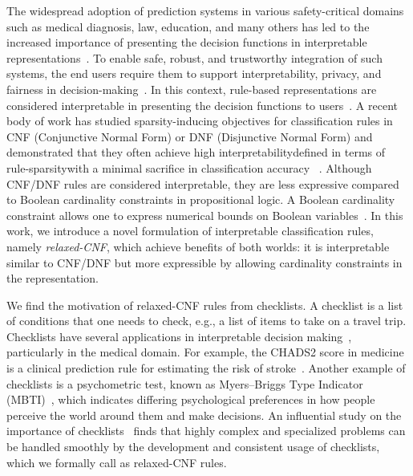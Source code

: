 

The widespread adoption of prediction systems in various safety-critical domains such as medical diagnosis, law, education, and many others has led to the increased importance of presenting the decision functions in interpretable representations~\cite{K2001,MVBB2005,SAD2015,S2014,TV2013}.  To enable  safe, robust, and trustworthy integration of such systems, the end users require them to support interpretability, privacy, and fairness in decision-making~\cite{DF2018,VML2012,WRLKM2015,ZUR2017}. In this context,  rule-based representations are considered interpretable in presenting the decision functions to users~\cite{LKCL2019,WR2015,WRDLKM2017}. A recent body of work has studied sparsity-inducing objectives for classification rules in CNF ({Conjunctive Normal Form}) or DNF ({Disjunctive Normal Form}) and demonstrated that they often achieve high interpretability\textemdash defined in terms of rule-sparsity\textemdash with a minimal sacrifice in classification accuracy ~\cite{GM2019,LKCL2019,MM18}. Although CNF/DNF rules are considered interpretable, they are less expressive compared to Boolean cardinality constraints in propositional logic. A Boolean cardinality constraint allows one to express numerical bounds on Boolean variables~\cite{sinz2005towards}. In this work, we introduce a novel formulation of interpretable classification rules, namely \emph{relaxed-CNF}, which achieve benefits of  both worlds: it is interpretable similar to CNF/DNF  but more expressible by allowing cardinality constraints in the representation.


We find the motivation of relaxed-CNF rules from checklists. A checklist is a list of conditions that one needs to check, e.g., a list of items to take on a travel trip.  Checklists have several applications in interpretable decision making~\cite{M1976,gage2001validation}, particularly in the medical domain. For example, the  CHADS2 score in medicine is a clinical prediction rule for estimating the risk of stroke~\cite{gage2001validation}. Another example of checklists is a psychometric test, known as Myers–Briggs Type Indicator (MBTI)~\cite{M1976}, which indicates differing psychological preferences in how people perceive the world around them and make decisions.  An influential study on the importance of {checklists}~\cite{G2010} finds that highly complex and specialized problems can be handled smoothly by the development and consistent usage of checklists, which we formally call as relaxed-CNF rules. 


